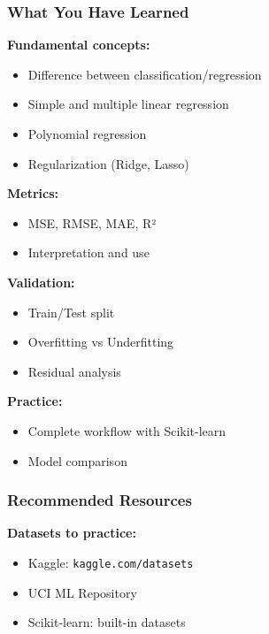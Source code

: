 \documentclass{beamer}
\begin{document}
\begin{frame}
\frametitle{What You Have Learned}
\textbf{Fundamental concepts:}
\begin{itemize}
    \item Difference between classification/regression
    \item Simple and multiple linear regression
    \item Polynomial regression
    \item Regularization (Ridge, Lasso)
\end{itemize}

\vspace{0.5em}
\textbf{Metrics:}
\begin{itemize}
    \item MSE, RMSE, MAE, R²
    \item Interpretation and use
\end{itemize}

\vspace{0.5em}
\textbf{Validation:}
\begin{itemize}
    \item Train/Test split
    \item Overfitting vs Underfitting
    \item Residual analysis
\end{itemize}

\vspace{0.5em}
\textbf{Practice:}
\begin{itemize}
    \item Complete workflow with Scikit-learn
    \item Model comparison
\end{itemize}
\end{frame}




\begin{frame}
\frametitle{Recommended Resources}


\textbf{Datasets to practice:}
\begin{itemize}
    \item Kaggle: \texttt{kaggle.com/datasets}
    \item UCI ML Repository
    \item Scikit-learn: built-in datasets
\end{itemize}
\end{frame}
\end{document}
